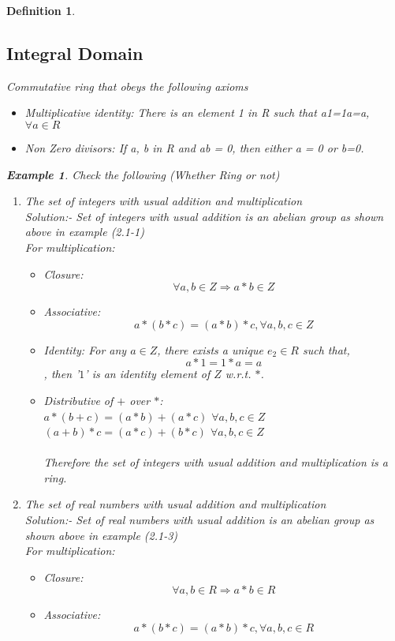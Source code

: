 \documentclass{article}
\newtheorem{defn}{Definition} [section]
\newtheorem{ex}{Example}[section]
\begin{document}
\begin{defn}
\begin{itemize}
\subsection{Integral Domain}
Commutative ring that obeys the following axioms
\begin{itemize}
    \item Multiplicative identity: There is an element 1 in R such that a1=1a=a, $ \forall a \in R $
    \item Non Zero divisors: If a, b in R and ab = 0, then either a = 0 or b=0.
\end{itemize}
\end{itemize}
\begin{ex} Check the following (Whether Ring or not)
\begin{enumerate} 
	\item The set of integers with usual addition and multiplication
	\\ Solution:- Set of integers with usual addition is an abelian group as shown above in example (2.1-1)
	\\For multiplication:
	\begin{itemize}
	    \item Closure: $$\forall a, b \in Z \Rightarrow a*b \in Z$$
        \item Associative: $$a*(b*c)=(a*b)*c, \forall a,b,c \in Z$$
	    \item Identity: For any $a \in Z$, there exists a unique $e_2 \in R$ such that, $$a*1=1*a=a$$, then '$1$' is an identity element of $Z$ w.r.t. $*$.
		\item Distributive of $+$ over $*$:\\
	        $a*(b+c)=(a*b)+ (a*c)$  $ \forall a,b,c \in Z $ \\
	        $(a+b)*c=(a*c)+(b*c)$   $ \forall a,b,c \in Z $ \\
	\\Therefore the set of integers with usual addition and multiplication is a ring.
	\end{itemize}
	\item The set of real numbers with usual addition and multiplication
	\\ Solution:- Set of real numbers with usual addition is an abelian group as shown above in example (2.1-3)
	\\For multiplication:
	\begin{itemize}
	    \item Closure: $$\forall a, b \in R \Rightarrow a*b \in R$$
        \item Associative: $$a*(b*c)=(a*b)*c, \forall a,b,c \in R$$

\end{itemize}
\end{enumerate}
\end{ex}
\end{defn}
\end{document}
